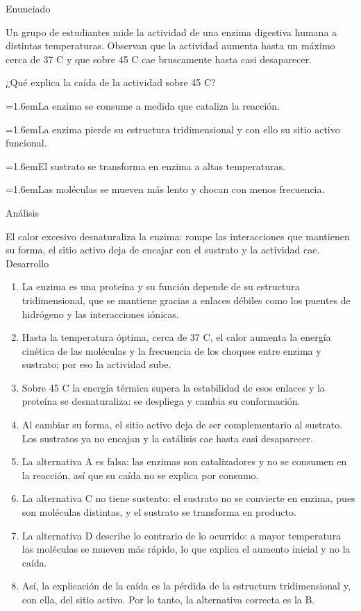 \documentclass[10pt,a4paper,twocolumn]{article}
\newcommand{\alternativa}[2]{\par\noindent\hangindent=1.6em\hangafter=1\makebox[1.6em][l]{\tecla{#1}}#2\par}
\newcommand{\clave}[1]{\par\smallskip{\sffamily\footnotesize\color{esmeralda} Clave \teclaok{#1}}\par}
\begin{document}
\begin{ejemplo}
{\sffamily\footnotesize\color{zinc500} Enunciado}\par
Un grupo de estudiantes mide la actividad de una enzima digestiva humana a distintas temperaturas. Observan que la actividad aumenta hasta un máximo cerca de 37 \textdegree{}C y que sobre 45 \textdegree{}C cae bruscamente hasta casi desaparecer.

¿Qué explica la caída de la actividad sobre 45 \textdegree{}C?
\alternativa{A}{La enzima se consume a medida que cataliza la reacción.}
\alternativa{B}{La enzima pierde su estructura tridimensional y con ello su sitio activo funcional.}
\alternativa{C}{El sustrato se transforma en enzima a altas temperaturas.}
\alternativa{D}{Las moléculas se mueven más lento y chocan con menos frecuencia.}
\clave{B}
{\sffamily\footnotesize\color{zinc500} Análisis}\par El calor excesivo desnaturaliza la enzima: rompe las interacciones que mantienen su forma, el sitio activo deja de encajar con el sustrato y la actividad cae.
{\sffamily\footnotesize\color{zinc500} Desarrollo}
\begin{enumerate}
  \item La enzima es una proteína y su función depende de su estructura tridimensional, que se mantiene gracias a enlaces débiles como los puentes de hidrógeno y las interacciones iónicas.
  \item Hasta la temperatura óptima, cerca de 37 \textdegree{}C, el calor aumenta la energía cinética de las moléculas y la frecuencia de los choques entre enzima y sustrato; por eso la actividad sube.
  \item Sobre 45 \textdegree{}C la energía térmica supera la estabilidad de esos enlaces y la proteína se desnaturaliza: se despliega y cambia su conformación.
  \item Al cambiar su forma, el sitio activo deja de ser complementario al sustrato. Los sustratos ya no encajan y la catálisis cae hasta casi desaparecer.
  \item La alternativa A es falsa: las enzimas son catalizadores y no se consumen en la reacción, así que su caída no se explica por consumo.
  \item La alternativa C no tiene sustento: el sustrato no se convierte en enzima, pues son moléculas distintas, y el sustrato se transforma en producto.
  \item La alternativa D describe lo contrario de lo ocurrido: a mayor temperatura las moléculas se mueven más rápido, lo que explica el aumento inicial y no la caída.
  \item Así, la explicación de la caída es la pérdida de la estructura tridimensional y, con ella, del sitio activo. Por lo tanto, la alternativa correcta es la B.
\end{enumerate}
\end{ejemplo}
\end{document}
